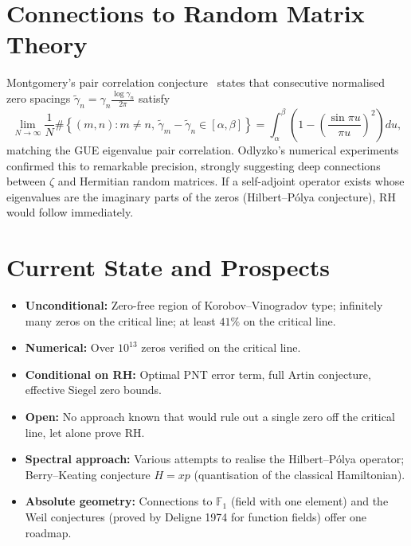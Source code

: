 \documentclass[12pt,a4paper]{article}
\theoremstyle{remark}
\begin{document}
\section{Connections to Random Matrix Theory}

Montgomery's pair correlation conjecture~\cite{Montgomery1973} states that consecutive
normalised zero spacings $\tilde\gamma_n = \gamma_n \frac{\log\gamma_n}{2\pi}$ satisfy
\[
  \lim_{N\to\infty} \frac{1}{N}\#\!\left\{(m,n): m\neq n,\, \tilde\gamma_m-\tilde\gamma_n \in [\alpha,\beta]\right\}
  = \int_\alpha^\beta \left(1 - \left(\frac{\sin\pi u}{\pi u}\right)^2\right)\!du,
\]
matching the GUE eigenvalue pair correlation.  Odlyzko's numerical experiments
confirmed this to remarkable precision, strongly suggesting deep connections between
$\zeta$ and Hermitian random matrices.  If a self-adjoint operator exists whose
eigenvalues are the imaginary parts of the zeros (Hilbert--Pólya conjecture), RH would
follow immediately.

\section{Current State and Prospects}

\begin{itemize}[nosep]
  \item \textbf{Unconditional:} Zero-free region of Korobov--Vinogradov type; infinitely
    many zeros on the critical line; at least $41\%$ on the critical line.
  \item \textbf{Numerical:} Over $10^{13}$ zeros verified on the critical line.
  \item \textbf{Conditional on RH:} Optimal PNT error term, full Artin conjecture,
    effective Siegel zero bounds.
  \item \textbf{Open:} No approach known that would rule out a single zero off the critical
    line, let alone prove RH.
  \item \textbf{Spectral approach:} Various attempts to realise the Hilbert--Pólya operator;
    Berry--Keating conjecture $H = xp$ (quantisation of the classical Hamiltonian).
  \item \textbf{Absolute geometry:} Connections to $\mathbb{F}_1$ (field with one element)
    and the Weil conjectures (proved by Deligne 1974 for function fields) offer one roadmap.
\end{itemize}
\end{document}
